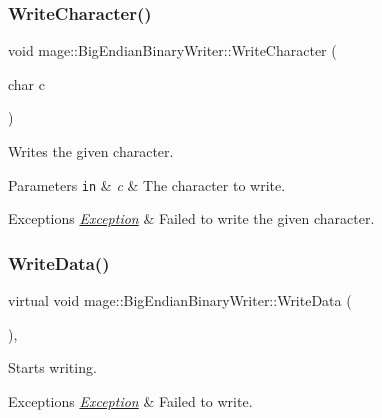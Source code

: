 \subsubsection{\texorpdfstring{Write\+Character()}{WriteCharacter()}}
{\footnotesize\ttfamily void mage\+::\+Big\+Endian\+Binary\+Writer\+::\+Write\+Character (\begin{DoxyParamCaption}\item[{char}]{c }\end{DoxyParamCaption})\hspace{0.3cm}{\ttfamily [protected]}}

Writes the given character.


\begin{DoxyParams}[1]{Parameters}
\mbox{\tt in}  & {\em c} & The character to write. \\
\hline
\end{DoxyParams}

\begin{DoxyExceptions}{Exceptions}
{\em \mbox{\hyperlink{classmage_1_1_exception}{Exception}}} & Failed to write the given character. \\
\hline
\end{DoxyExceptions}
\mbox{\label{classmage_1_1_big_endian_binary_writer_a719581274b1b185ef05687183f7ded25}} 
\subsubsection{\texorpdfstring{Write\+Data()}{WriteData()}}
{\footnotesize\ttfamily virtual void mage\+::\+Big\+Endian\+Binary\+Writer\+::\+Write\+Data (\begin{DoxyParamCaption}{ }\end{DoxyParamCaption})\hspace{0.3cm}{\ttfamily [private]}, {}}

Starts writing.


\begin{DoxyExceptions}{Exceptions}
{\em \mbox{\hyperlink{classmage_1_1_exception}{Exception}}} & Failed to write. \\
\hline
\end{DoxyExceptions}


